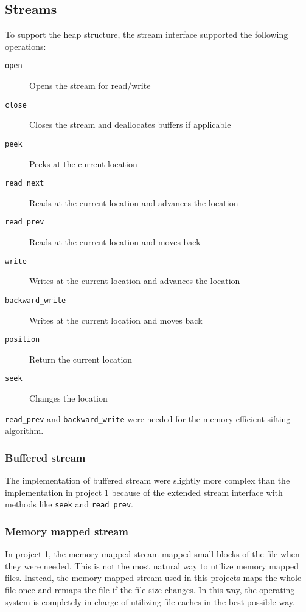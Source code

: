 \subsection{Streams}

To support the heap structure, the stream interface supported the following operations:

\begin{description}
\item[{\texttt{open}}] Opens the stream for read/write
\item[{\texttt{close}}] Closes the stream and deallocates buffers if applicable
\item[{\texttt{peek}}] Peeks at the current location
\item[{\texttt{read\_next}}] Reads at the current location and advances the location
\item[{\texttt{read\_prev}}] Reads at the current location and moves back
\item[{\texttt{write}}] Writes at the current location and advances the location
\item[{\texttt{backward\_write}}] Writes at the current location and moves back
\item[{\texttt{position}}] Return the current location
\item[{\texttt{seek}}] Changes the location
\end{description}

\texttt{read\_prev} and \texttt{backward\_write} were needed for the memory efficient sifting algorithm.

\subsubsection{Buffered stream}

The implementation of buffered stream were slightly more complex than the implementation in project 1 because of the extended stream interface with methods like \texttt{seek} and \texttt{read\_prev}.


\subsubsection{Memory mapped stream}

In project 1, the memory mapped stream mapped small blocks of the file when they were needed. This is not the most natural way to utilize memory mapped files. Instead, the memory mapped stream used in this projects maps the whole file once and remaps the file if the file size changes. In this way, the operating system is completely in charge of utilizing file caches in the best possible way.

